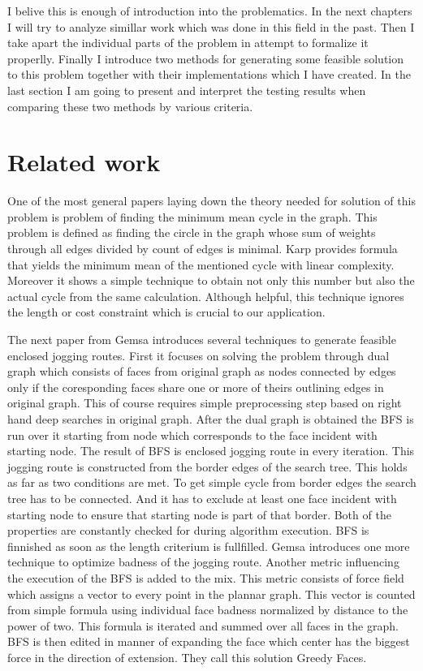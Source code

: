 \documentclass{ctuthesis}
\begin{document}
I belive this is enough of introduction into the problematics. In the next chapters I will try to  analyze simillar work which was done in this field in the past. Then I take apart the individual parts of the problem in attempt to formalize it properlly. Finally I introduce two methods for generating some feasible solution to this problem together with their implementations which I have created. In the last section I am going to present and interpret the testing results when comparing these two methods by various criteria.



\chapter{Related work}

One of the most general papers laying down the theory needed for solution of this problem is problem of finding the minimum mean cycle in the graph. \cite{karp} This problem is defined as finding the circle in the graph whose sum of weights through all edges divided by count of edges is minimal. Karp provides formula that yields the minimum mean of the mentioned cycle with linear complexity. Moreover it shows a simple technique to obtain not only this number but also the actual cycle from the same calculation. Although helpful, this technique ignores the length or cost constraint which is crucial to our application.\par

The next paper from Gemsa \cite{jogging} introduces several techniques to generate feasible enclosed jogging routes. First it focuses on solving the problem through dual graph which consists of faces from original graph as nodes connected by edges only if the coresponding faces share one or more of theirs outlining edges in original graph. This of course requires simple preprocessing step based on right hand deep searches in original graph. After the dual graph is obtained the BFS is run over it starting from node which corresponds to the face incident with starting node. The result of BFS is enclosed jogging route in every iteration. This jogging route is constructed from the border edges of the search tree. This holds as far as two conditions are met. To get simple cycle from border edges the search tree has to be connected. And it has to exclude at least one face incident with starting node to ensure that starting node is part of that border. Both of the properties are constantly checked for during algorithm execution. BFS is finnished as soon as the length criterium is fullfilled. Gemsa introduces one more technique to optimize badness of the jogging route. Another metric influencing the execution of the BFS is added to the mix. This metric consists of force field which assigns a vector to every point in the plannar graph. This vector is counted from simple formula using individual face badness normalized by distance to the power of two. This formula is iterated and summed over all faces in the graph. BFS is then edited in manner of expanding the face which center has the biggest force in the direction of extension. They call this solution Greedy Faces.\par
\end{document}
